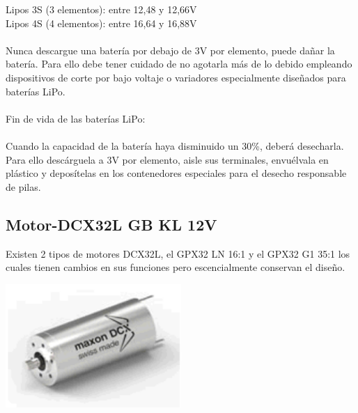 \documentclass[a4paper]{book}
\begin{document}
    Lipos 3S (3 elementos): entre 12,48 y 12,66V\\
    Lipos 4S (4 elementos): entre 16,64 y 16,88V\\
\\
Nunca descargue una batería por debajo de 3V por elemento, puede dañar la batería. Para ello debe tener cuidado de no agotarla más de lo debido empleando dispositivos de corte por bajo voltaje o variadores especialmente diseñados para baterías LiPo.\\
\\
Fin de vida de las baterías LiPo:\\
\\
Cuando la capacidad de la batería haya disminuido un 30\%, deberá desecharla. Para ello descárguela a 3V por elemento, aisle sus terminales, envuélvala en plástico y deposítelas en los contenedores especiales para el desecho responsable de pilas.\\

\subsection{Motor-DCX32L GB KL 12V}
Existen 2 tipos de motores DCX32L, el GPX32 LN 16:1 y el GPX32 G1 35:1 los cuales tienen cambios en sus funciones pero escencialmente conservan el diseño.
\begin{center}
\includegraphics[width=0.5\textwidth]{Figures/Hardware/Partes/DCX32L.png}
\label{fig:Hardware:Partes:Motor:DCX32L}
\end{center}
\end{document}
